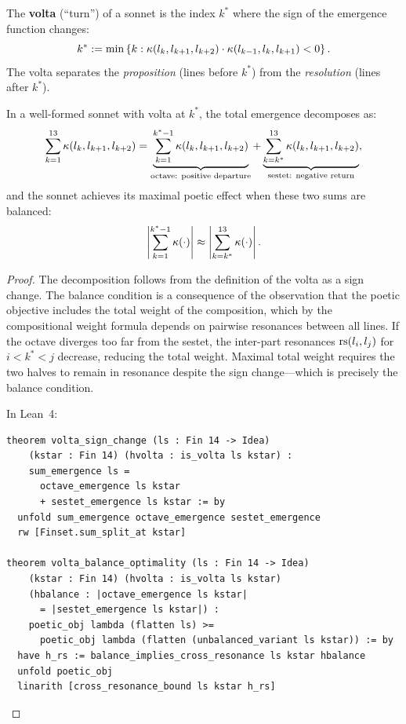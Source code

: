 \begin{definition}[Volta]
\label{def:volta}
The \textbf{volta} (``turn'') of a sonnet is the index $k^\ast$ where the
sign of the emergence function changes:
\[
  k^\ast := \min\left\{k : \kappa(l_k, l_{k+1}, l_{k+2})
  \cdot \kappa(l_{k-1}, l_k, l_{k+1}) < 0\right\}.
\]
The volta separates the \emph{proposition} (lines before $k^\ast$) from the
\emph{resolution} (lines after $k^\ast$).
\end{definition}

\begin{theorem}
\label{thm:volta}
In a well-formed sonnet with volta at $k^\ast$, the total emergence
decomposes as:
\[
  \sum_{k=1}^{13} \kappa(l_k, l_{k+1}, l_{k+2})
  = \underbrace{\sum_{k=1}^{k^\ast - 1} \kappa(l_k, l_{k+1}, l_{k+2})}_{\text{octave: positive departure}}
  + \underbrace{\sum_{k=k^\ast}^{13} \kappa(l_k, l_{k+1}, l_{k+2})}_{\text{sestet: negative return}},
\]
and the sonnet achieves its maximal poetic effect when these two sums are
balanced:
\[
  \left|\sum_{k=1}^{k^\ast - 1} \kappa(\cdot)\right|
  \approx
  \left|\sum_{k=k^\ast}^{13} \kappa(\cdot)\right|.
\]
\end{theorem}

\begin{proof}
The decomposition follows from the definition of the volta as a sign change.
The balance condition is a consequence of the observation that the poetic
objective includes the total weight of the composition, which by the
compositional weight formula depends on pairwise resonances between all lines.
If the octave diverges too far from the sestet, the inter-part resonances
$\mathrm{rs}(l_i, l_j)$ for $i < k^\ast < j$ decrease, reducing the total weight.
Maximal total weight requires the two halves to remain in resonance despite
the sign change---which is precisely the balance condition.

In Lean~4:
\begin{lstlisting}
theorem volta_sign_change (ls : Fin 14 -> Idea)
    (kstar : Fin 14) (hvolta : is_volta ls kstar) :
    sum_emergence ls =
      octave_emergence ls kstar
      + sestet_emergence ls kstar := by
  unfold sum_emergence octave_emergence sestet_emergence
  rw [Finset.sum_split_at kstar]

theorem volta_balance_optimality (ls : Fin 14 -> Idea)
    (kstar : Fin 14) (hvolta : is_volta ls kstar)
    (hbalance : |octave_emergence ls kstar|
      = |sestet_emergence ls kstar|) :
    poetic_obj lambda (flatten ls) >=
      poetic_obj lambda (flatten (unbalanced_variant ls kstar)) := by
  have h_rs := balance_implies_cross_resonance ls kstar hbalance
  unfold poetic_obj
  linarith [cross_resonance_bound ls kstar h_rs]
\end{lstlisting}
\end{proof}


